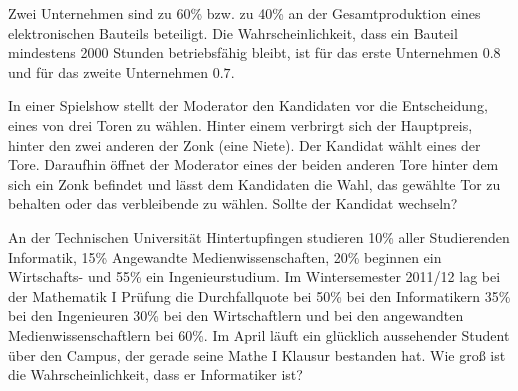 \documentclass[10pt, a4paper]{exam}
\begin{document}
\begin{questions}
    \question Zwei Unternehmen sind zu 60\% bzw. zu 40\% an der Gesamtproduktion eines elektronischen Bauteils beteiligt. Die Wahrscheinlichkeit, dass ein Bauteil mindestens 2000 Stunden betriebsfähig bleibt, ist für das erste Unternehmen $0.8$ und für das zweite Unternehmen $0.7$.

    \question In einer Spielshow stellt der Moderator den Kandidaten vor die Entscheidung, eines von drei Toren zu wählen. Hinter einem verbrirgt sich der Hauptpreis, hinter den zwei anderen der Zonk (eine Niete). Der Kandidat wählt eines der Tore. Daraufhin öffnet der Moderator eines der beiden anderen Tore hinter dem sich ein Zonk befindet und lässt dem Kandidaten die Wahl, das gewählte Tor zu behalten oder das verbleibende zu wählen. Sollte der Kandidat wechseln?
    \begin{solution}
    \end{solution}

    \question An der Technischen Universität Hintertupfingen studieren 10\% aller Studierenden Informatik, 15\% Angewandte Medienwissenschaften, 20\% beginnen ein Wirtschafts- und 55\% ein Ingenieurstudium. Im Wintersemester 2011/12 lag bei der Mathematik I Prüfung die Durchfallquote bei 50\% bei den Informatikern 35\% bei den Ingenieuren 30\% bei den Wirtschaftlern und bei den angewandten Medienwissenschaftlern bei 60\%. Im April läuft ein glücklich aussehender Student über den Campus, der gerade seine Mathe I Klausur bestanden hat. Wie groß ist die Wahrscheinlichkeit, dass er Informatiker ist?
    \begin{solution}
    \end{solution}


\end{questions}
\end{document}
